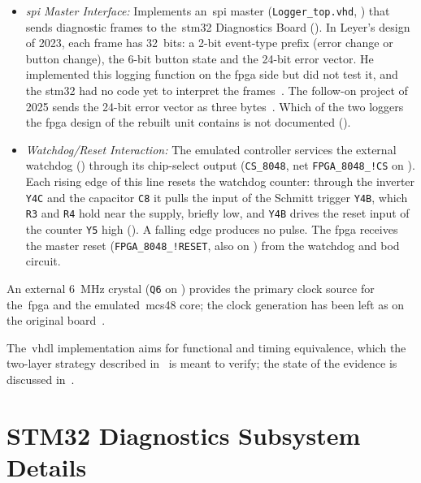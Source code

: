 \begin{description}
\begin{itemize}
		      \item \textit{\gls{spi} Master Interface:} Implements an~\gls{spi} master (\texttt{Logger\_top.vhd}, ) that sends diagnostic frames to the~\gls{stm32} Diagnostics Board (). In Leyer's design of 2023, each frame has 32~bits: a 2-bit event-type prefix (error change or button change), the 6-bit button state and the 24-bit error vector. He implemented this logging function on the \gls{fpga} side but did not test it, and the \gls{stm32} had no code yet to interpret the frames~\cite[Sec.~3.3]{leyer2023}. The follow-on project of 2025 sends the 24-bit error vector as three bytes~\cite[pp.~20--21]{savchuk2025}. Which of the two loggers the \gls{fpga} design of the rebuilt unit contains is not documented ().
		      \item \textit{Watchdog/Reset Interaction:} The emulated controller services the external watchdog () through its chip-select output (\texttt{CS\_8048}, net \texttt{FPGA\_8048\_!CS} on ). Each rising edge of this line resets the watchdog counter: through the inverter \texttt{Y4C} and the capacitor \texttt{C8} it pulls the input of the Schmitt trigger \texttt{Y4B}, which \texttt{R3} and \texttt{R4} hold near the supply, briefly low, and \texttt{Y4B} drives the reset input of the counter \texttt{Y5} high (). A falling edge produces no pulse. The \gls{fpga} receives the master reset (\texttt{FPGA\_8048\_!RESET}, also on ) from the watchdog and \gls{bod} circuit.
	      \end{itemize}
	\item[Clocking:] An external \SI{6}{\mega\hertz} crystal (\texttt{Q6} on ) provides the primary clock source for the~\gls{fpga} and the emulated~\gls{mcs48} core; the clock generation has been left as on the original board~\cite[Sec.~2]{leyer2023}.
\end{description}
The~\gls{vhdl} implementation aims for functional and timing equivalence, which the two-layer strategy described in~ is meant to verify; the state of the evidence is discussed in~.

\section{STM32 Diagnostics Subsystem Details}
\label{sec:stm32_details}

